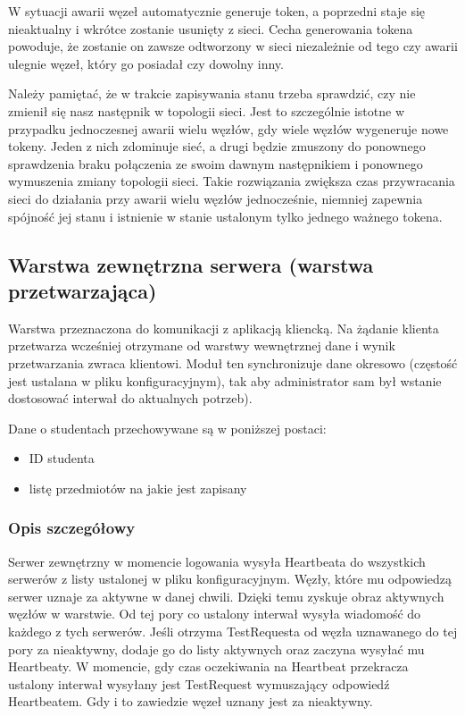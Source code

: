 {\par{W sytuacji awarii węzeł automatycznie generuje token, a poprzedni staje się nieaktualny i wkrótce zostanie usunięty z sieci. Cecha generowania tokena powoduje, że zostanie on zawsze odtworzony w sieci niezależnie od tego czy awarii ulegnie węzeł, który go posiadał czy dowolny inny.}

\par{Należy pamiętać, że w trakcie zapisywania stanu trzeba sprawdzić, czy nie zmienił się nasz następnik w topologii sieci. Jest to szczególnie istotne w przypadku jednoczesnej awarii wielu węzłów, gdy wiele węzłów wygeneruje nowe tokeny. Jeden z nich zdominuje sieć, a drugi będzie zmuszony do ponownego sprawdzenia braku połączenia ze swoim dawnym następnikiem i ponownego wymuszenia zmiany topologii sieci. Takie rozwiązania zwiększa czas przywracania sieci do działania przy awarii wielu węzłów jednocześnie, niemniej zapewnia spójność jej stanu i istnienie w stanie ustalonym tylko jednego ważnego tokena.}


\subsection[Warstwa zewnętrzna serwera]{Warstwa zewnętrzna serwera (warstwa przetwarzająca)}

\par{Warstwa przeznaczona do komunikacji z aplikacją kliencką. Na żądanie klienta przetwarza wcześniej otrzymane od warstwy wewnętrznej dane i wynik przetwarzania zwraca klientowi. Moduł ten synchronizuje dane okresowo (częstość jest ustalana w pliku konfiguracyjnym), tak aby administrator sam był wstanie dostosować interwał do aktualnych potrzeb).}

\par{Dane o studentach przechowywane są w poniższej postaci:}

\begin{itemize}
\item ID studenta
\item listę przedmiotów na jakie jest zapisany
\end{itemize}

\subsubsection*[Opis szczegółowy]{Opis szczegółowy}
\par{Serwer zewnętrzny w momencie logowania wysyła Heartbeata do wszystkich serwerów z listy ustalonej w pliku konfiguracyjnym. Węzły, które mu odpowiedzą serwer uznaje za aktywne w danej chwili. Dzięki temu zyskuje obraz aktywnych węzłów w warstwie. Od tej pory co ustalony interwał wysyła wiadomość do każdego z tych serwerów. Jeśli otrzyma TestRequesta od węzła uznawanego do tej pory za nieaktywny, dodaje go do listy aktywnych oraz zaczyna wysyłać mu Heartbeaty. W momencie, gdy czas oczekiwania na Heartbeat przekracza ustalony interwał wysyłany jest TestRequest wymuszający odpowiedź Heartbeatem. Gdy i to zawiedzie węzeł uznany jest za nieaktywny.}

}
